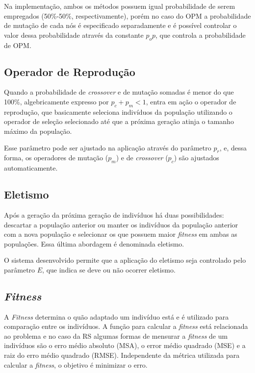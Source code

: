 \documentclass[a4paper]{paper}
\begin{document}
Na implementação, ambos os métodos possuem igual probabilidade de serem
empregados (50\%-50\%, respectivamente), porém no caso do OPM a probabilidade de
mutação de cada nós é especificado separadamente e é possível controlar o valor
dessa probabilidade através da constante $p_op$, que controla a probabilidade de
OPM.

\subsection{Operador de Reprodução} \label{subsec:reproduction}

Quando a probabilidade de \textit{crossover} e de mutação somadas é menor do que
100\%, algebricamente expresso por $p_c + p_m < 1$, entra em ação o operador
de reprodução, que basicamente seleciona indivíduos da população utilizando
o operador de seleção selecionado até que a próxima geração atinja o tamanho
máximo da população.

Esse parâmetro pode ser ajustado na aplicação através do parâmetro $p_r$, e,
dessa forma, os operadores de mutação ($p_m$) e de \textit{crossover} ($p_c$)
são ajustados automaticamente.

\subsection{Eletismo}

Após a geração da próxima geração de indivíduos há duas possibilidades:
descartar a população anterior ou manter os indivíduos da população anterior
com a nova população e selecionar os que possuem maior \textit{fitness} em ambas
as populações. Essa última abordagem é denominada eletismo.

O sistema desenvolvido permite que a aplicação do eletismo seja controlado pelo
parâmetro $E$, que indica se deve ou não ocorrer eletismo.

\subsection{\textit{Fitness}}

A \textit{Fitness} determina o quão adaptado um indivíduo está e é utilizado
para comparação entre os indivíduos. A função para calcular a \textit{fitness}
está relacionada ao problema e no caso da RS algumas formas de mensurar a
\textit{fitness} de um indivíduos são o erro médio absoluto (MSA), o error médio
quadrado (MSE) e a raiz do erro médio quadrado (RMSE). Independente da métrica
utilizada para calcular a \textit{fitness}, o objetivo é minimizar o erro.
\end{document}
